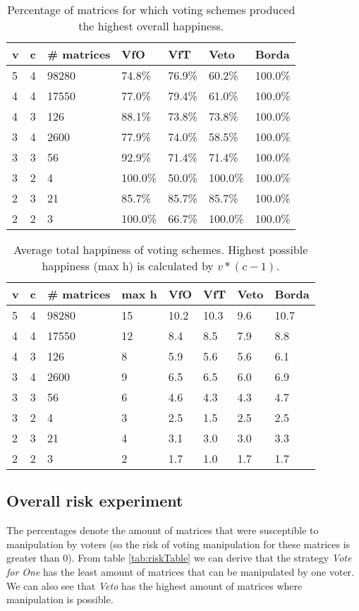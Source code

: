 \begin{table}[h]
\begin{tabular}{ll|lllll}
v & c & \# matrices &  VfO   & VfT   & Veto & Borda \\
\hline
5 & 4 & 98280 & 74.8\%  & 76.9\% & 60.2\%  & 100.0\% \\
4 & 4 & 17550 & 77.0\%  & 79.4\% & 61.0\%  & 100.0\% \\
4 & 3 & 126   & 88.1\%  & 73.8\% & 73.8\%  & 100.0\% \\
3 & 4 & 2600  & 77.9\%  & 74.0\% & 58.5\%  & 100.0\% \\
3 & 3 & 56    & 92.9\%  & 71.4\% & 71.4\%  & 100.0\% \\
3 & 2 & 4     & 100.0\% & 50.0\% & 100.0\% & 100.0\% \\
2 & 3 & 21    & 85.7\%  & 85.7\% & 85.7\%  & 100.0\% \\
2 & 2 & 3     & 100.0\% & 66.7\% & 100.0\% & 100.0\%     
\end{tabular}
\caption{Percentage of matrices for which voting schemes produced the highest overall happiness.}
\label{tab:happinessTable}
\end{table}

\begin{table}[h]
\begin{tabular}{ll|llllll}
v & c & \# matrices & max h & VfO   & VfT   & Veto & Borda \\
\hline
5 & 4 & 98280 & 15 & 10.2 & 10.3 & 9.6 & 10.7  \\
4 & 4 & 17550 & 12 & 8.4 & 8.5  & 7.9  & 8.8   \\
4 & 3 & 126   & 8  & 5.9 & 5.6  & 5.6  & 6.1     \\
3 & 4 & 2600  & 9  & 6.5 & 6.5  & 6.0  & 6.9    \\
3 & 3 & 56    & 6  & 4.6 & 4.3  & 4.3  & 4.7     \\
3 & 2 & 4     & 3  & 2.5 & 1.5  & 2.5  & 2.5     \\
2 & 3 & 21    & 4  & 3.1 & 3.0  & 3.0  & 3.3     \\
2 & 2 & 3     & 2  & 1.7 & 1.0  & 1.7  & 1.7     
\end{tabular}
\caption{Average total happiness of voting schemes. Highest possible happiness (max h) is calculated by $v*(c-1)$.}
\label{tab:totsHapsTable}
\end{table}

\subsection{Overall risk experiment}
The percentages denote the amount of matrices that were susceptible to manipulation by voters (so the risk of voting manipulation for these matrices is greater than 0). From table \ref{tab:riskTable} we can derive that the strategy \textit{Vote for One} has the least amount of matrices that can be manipulated by one voter. We can also see that \textit{Veto} has the highest amount of matrices where manipulation is possible.

